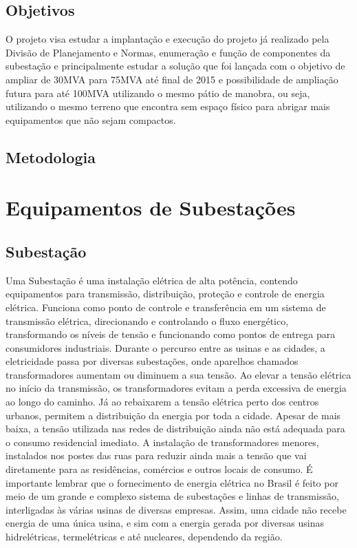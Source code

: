 \documentclass[a5paper,english,spanish,brazil]{ufsc-thesis}
\begin{document}
\section{Objetivos}
O projeto visa estudar a implantação e execução do projeto já realizado pela Divisão de Planejamento e Normas, enumeração e função de componentes da subestação e principalmente estudar a solução que foi lançada com o objetivo de ampliar de 30MVA para 75MVA até final de 2015 e possibilidade de ampliação futura para até 100MVA utilizando o mesmo pátio de manobra, ou seja, utilizando o mesmo terreno que encontra sem espaço físico para abrigar mais equipamentos que não sejam compactos.

\section{Metodologia}
\lipsum[1]


\chapter{Equipamentos de Subestações}
\label{chap:equipSE}

\section{Subestação}
Uma Subestação é uma instalação elétrica de alta potência, contendo equipamentos para transmissão, distribuição, proteção e controle de energia elétrica. Funciona como ponto de controle e transferência em um sistema de transmissão elétrica, direcionando e controlando o fluxo energético, transformando os níveis de tensão e funcionando como pontos de entrega para consumidores industriais. Durante o percurso entre as usinas e as cidades, a eletricidade passa por diversas subestações, onde aparelhos chamados transformadores aumentam ou diminuem a sua tensão. Ao elevar a tensão elétrica no início da transmissão, os transformadores evitam a perda excessiva de energia ao longo do caminho. Já ao rebaixarem a tensão elétrica perto dos centros urbanos, permitem a distribuição da energia por toda a cidade. Apesar de mais baixa, a tensão utilizada nas redes de distribuição ainda não está adequada para o consumo residencial imediato. A instalação de transformadores menores, instalados nos postes das ruas para reduzir ainda mais a tensão que vai diretamente para as residências, comércios e outros locais de consumo. É importante lembrar que o fornecimento de energia elétrica no Brasil é feito por meio de um grande e complexo sistema de subestações e linhas de transmissão, interligadas às várias usinas de diversas empresas. Assim, uma cidade não recebe energia de uma única usina, e sim com a energia gerada por diversas usinas hidrelétricas, termelétricas e até nucleares, dependendo da região.
\end{document}
